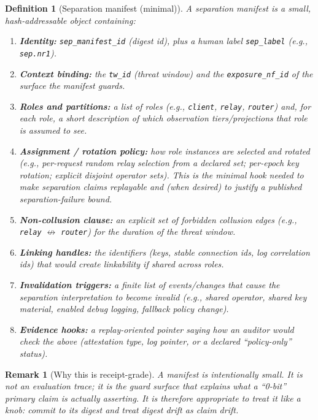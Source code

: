 \documentclass[11pt]{article}
\newtheorem{definition}{Definition}
\newtheorem{remark}{Remark}
\begin{document}
\begin{definition}[Separation manifest (minimal)]\label{def:sepmanifest}
A \emph{separation manifest} is a small, hash-addressable object containing:
\begin{enumerate}[leftmargin=*]
\item \textbf{Identity:} \texttt{sep\_manifest\_id} (digest id), plus a human label \texttt{sep\_label} (e.g., \texttt{sep.nr1}).
\item \textbf{Context binding:} the \texttt{tw\_id} (threat window) and the \texttt{exposure\_nf\_id} of the surface the manifest guards.\cite{series:threatwindows,series:traceifaces}
\item \textbf{Roles and partitions:} a list of roles (e.g., \texttt{client}, \texttt{relay}, \texttt{router}) and, for each role, a short description of which observation tiers/projections that role is assumed to see.
\item \textbf{Assignment / rotation policy:} how role instances are selected and rotated (e.g., per-request random relay selection from a declared set; per-epoch key rotation; explicit disjoint operator sets). This is the minimal hook needed to make separation claims replayable and (when desired) to justify a published separation-failure bound.\cite{series:probsep}
\item \textbf{Non-collusion clause:} an explicit set of forbidden collusion edges (e.g., \texttt{relay} $\not\leftrightarrow$ \texttt{router}) for the duration of the threat window.
\item \textbf{Linking handles:} the identifiers (keys, stable connection ids, log correlation ids) that would create linkability if shared across roles.
\item \textbf{Invalidation triggers:} a finite list of events/changes that cause the separation interpretation to become invalid (e.g., shared operator, shared key material, enabled debug logging, fallback policy change).
\item \textbf{Evidence hooks:} a replay-oriented pointer saying how an auditor would check the above (attestation type, log pointer, or a declared ``policy-only'' status).
\end{enumerate}
\end{definition}

\begin{remark}[Why this is receipt-grade]
A manifest is intentionally small.
It is not an evaluation trace; it is the \emph{guard surface} that explains what a ``0-bit'' primary claim is actually asserting.
It is therefore appropriate to treat it like a knob: commit to its digest and treat digest drift as claim drift.
\end{remark}
\end{document}
